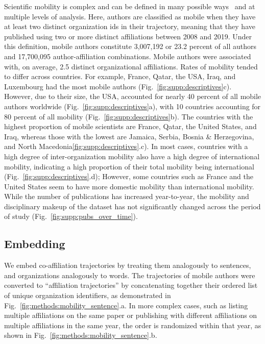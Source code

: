 \documentclass[12pt]{article} %
\begin{document}
Scientific mobility is complex and can be defined in many possible ways~\autocite{robinson2019mobility} and at multiple levels of analysis.
Here, authors are classified as mobile when they have at least two distinct organization ids in their trajectory, meaning that they have published using two or more distinct affiliations between 2008 and 2019.
Under this definition, mobile authors constitute 3,007,192 or 23.2 percent of all authors and 17,700,095 author-affiliation combinations.
Mobile authors were associated with, on average, 2.5 distinct organizational affiliations.
Rates of mobility tended to differ across countries.
For example, France, Qatar, the USA, Iraq, and Luxembourg had the most mobile authors (Fig.~\ref{fig:supp:descriptives}c).
However, due to their size, the USA, accounted for nearly 40 percent of all mobile authors worldwide (Fig.~\ref{fig:supp:descriptives}a), with 10 countries accounting for 80 percent of all mobility (Fig.~\ref{fig:supp:descriptives}b).
The countries with the highest proportion of mobile scientists are France, Qatar, the United States, and Iraq, whereas those with the lowest are Jamaica, Serbia, Bosnia \& Herzegovina, and North Macedonia\ref{fig:supp:descriptives}.c).
In most cases, countries with a high degree of inter-organization mobility also have a high degree of international mobility, indicating a high proportion of their total mobility being international (Fig.~\ref{fig:supp:descriptives}.d);
However, some countries such as France and the United States seem to have more domestic mobility than international mobility. 
While the number of publications has increased year-to-year, the mobility and disciplinary makeup of the dataset has not significantly changed across the period of study (Fig.~\ref{fig:supp:pubs_over_time}).




\subsection*{Embedding}
We embed co-affiliation trajectories by treating them analogously to sentences, and organizations analogously to words.
The trajectories of mobile authors were converted to ``affiliation trajectories'' by concatenating together their ordered list of unique organization identifiers, as demonstrated in Fig.~\ref{fig:methods:mobility_sentence}.a.
In more complex cases, such as listing multiple affiliations on the same paper or publishing with different affiliations on multiple affiliations in the same year, the order is randomized within that year, as shown in  Fig.~\ref{fig:methods:mobility_sentence}.b.
\end{document}
